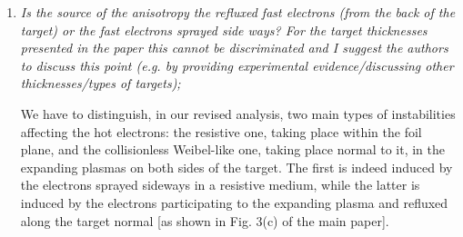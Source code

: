 \documentclass[aps,showpacs,superscriptaddress]{revtex4}%
\begin{document}
\begin{enumerate}
\item \textit{Is the source of the anisotropy the refluxed fast electrons (from the back of the target) or the fast electrons sprayed side ways? For the target thicknesses presented in the paper this cannot be discriminated and I suggest the authors to discuss this point (e.g. by providing experimental evidence/discussing other thicknesses/types of targets); }

We have to distinguish, in our revised analysis, two main types of instabilities affecting the hot electrons: the resistive one, taking place within the foil plane, and the collisionless Weibel-like one, taking place normal to it, in the expanding plasmas on both sides of the target. The first is indeed induced by the electrons sprayed sideways in a resistive medium, while the latter is induced by the electrons participating to the expanding plasma and refluxed along the target normal [as shown in Fig. 3(c) of the main paper].

%
%


\end{enumerate}
\end{document}
